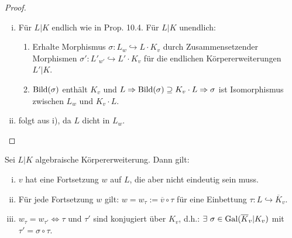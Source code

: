 \begin{proof}
\begin{enumerate}[i)]
\item Für $L|K$ endlich wie in Prop. 10.4. Für $L|K$ unendlich:
\begin{enumerate}[(1)]
\item Erhalte Morphismus $\sigma: L_w \hookrightarrow L \cdot K_v$ durch \glqq Zusammensetzen\grqq der Morphismen $\sigma': L'_{w'} \hookrightarrow L' \cdot K_v$ für die endlichen Körpererweiterungen $L'|K$.
\item $\operatorname{Bild}(\sigma)$ enthält $K_v$ und $L \Rightarrow \operatorname{Bild}(\sigma) \supseteq K_v \cdot L \Rightarrow \sigma$ ist Isomorphismus zwischen $L_w$ und $K_v \cdot L$.
\end{enumerate}
\item folgt aus i), da $L$ dicht in $L_w$.
\end{enumerate}
\end{proof}

\begin{Satz}
Sei $L|K$ algebraische Körpererweiterung. Dann gilt:
\begin{enumerate}[i)]
\item $v$ hat eine Fortsetzung $w$ auf $L$, die aber nicht eindeutig sein muss.
\item Für jede Fortsetzung $w$ gilt: $w=w_\tau:=\overline{v} \circ \tau$ für eine Einbettung $\tau: L \hookrightarrow \overline{K}_v$.
\item $w_\tau = w_{\tau'} \iff \tau$ und $\tau'$ sind konjugiert über $K_v$, d.h.: $\exists \ \sigma \in \operatorname{Gal}(\overline{K}_v | K_v)$ mit $\tau'=\sigma \circ \tau$.
\end{enumerate}
\end{Satz}

